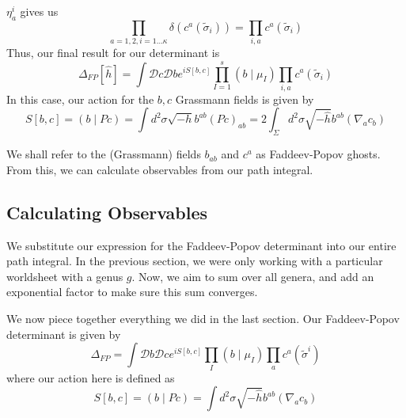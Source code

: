 \documentclass[11pt, oneside]{article}   	%
\theoremstyle{slanted}
\begin{document}
$ \eta _ a ^ i $ gives us 
\[
\prod_{ a = 1 , 2 , i = 1 \dots \kappa }  
\delta \left( c ^ a \left( \tilde{ \sigma } _ i   \right)   \right) 
= \prod _{ i , a } c ^ a \left( \tilde{ \sigma } _ i   \right) 
\] Thus, 
our final result for our determinant is 
\[
\Delta _{ FP } \left[  \hat{ h }  \right]  
= \int \mathcal{D } c \mathcal{ D } b 
e ^{ i S \left[  b, c  \right]  } \prod_{ I  = 1 } ^ s 
\left( b \mid \mu _ I  \right)  \prod_{ i , a } c ^ a 
\left( \tilde{ \sigma } _ i   \right) 
\] In this case, our action for the 
$ b, c  $ Grassmann fields is given by 
\[
S \left[  b, c  \right]  
= \left( b \mid P c  \right)  
= \int d ^ 2 \sigma \sqrt{  -h }  b ^{ ab } \left( P c  \right)  _{ ab } 
= 2 \int _{ \Sigma } d ^ 2 \sigma \sqrt{  - \hat{ h } }  b ^{ ab } 
\left( \nabla _ a c _ b  \right) 
\]

We shall refer to the 
(Grassmann) fields $ b _{ab } $ and $ c ^ a $ as 
Faddeev-Popov ghosts. 
From this, we can 
calculate observables 
from our path integral. 

\subsection{Calculating Observables}
We substitute our expression for 
the Faddeev-Popov determinant into our entire 
path integral. In the previous section, we 
were only working with a particular worldsheet 
with a genus $ g $. Now, we aim to sum
over all genera, and add an exponential 
factor to make sure this sum converges. 

We now piece together everything we did in the 
last section.
Our Faddeev-Popov determinant is given 
by 
\[
\Delta _{ FP }  = \int \mathcal{ D } b \mathcal{ D } c e ^{ i S \left[  b, c  \right]  } 
\prod_ I \left( b \mid \mu _I   \right)  \prod _ a c ^ a \left( 
\tilde{\sigma } ^ i  \right) 
\]  where our action here is defined as 
\[
S \left[  b, c  \right]   = 
\left( b \mid P c  \right)   = \int d ^ 2 \sigma 
\sqrt{ - \hat{ h }  }  b ^{ ab } \left( \nabla _ a c _b  \right)  
\] 
\end{document}
